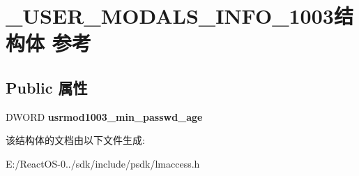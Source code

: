 \hypertarget{struct___u_s_e_r___m_o_d_a_l_s___i_n_f_o__1003}{}\section{\+\_\+\+U\+S\+E\+R\+\_\+\+M\+O\+D\+A\+L\+S\+\_\+\+I\+N\+F\+O\+\_\+1003结构体 参考}
\label{struct___u_s_e_r___m_o_d_a_l_s___i_n_f_o__1003}
\subsection*{Public 属性}
\begin{DoxyCompactItemize}
\item 
\mbox{\label{struct___u_s_e_r___m_o_d_a_l_s___i_n_f_o__1003_a3c0e2059aada306413c7fb7d5e4e53a3}} 
D\+W\+O\+RD {\bfseries usrmod1003\+\_\+min\+\_\+passwd\+\_\+age}
\end{DoxyCompactItemize}


该结构体的文档由以下文件生成\+:\begin{DoxyCompactItemize}
\item 
E\+:/\+React\+O\+S-\/0../sdk/include/psdk/lmaccess.\+h\end{DoxyCompactItemize}
